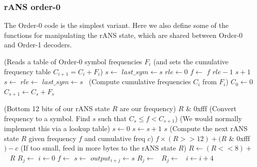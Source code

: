\documentclass[a4paper]{article}
\begin{document}
\subsubsection*{rANS order-0}

The Order-0 code is the simplest variant.
Here we also define some of the functions for manipulating the rANS state, which are shared between Order-0 and Order-1 decoders.

\vskip 0.5cm

\begin{algorithmic}[1]
\Statex (Reads a table of Order-0 symbol frequencies $F_i$
\Statex (and sets the cumulative frequency table $C_{i+1} = C_i+F_i$)
\State $s \gets$ 
\State $last\_sym \gets s$
\State $rle \gets 0$
\Repeat
  \State $f \gets$ 
  \settowidth{\maxwidth}{$C_s$}
  \State {} $f$
    \settowidth{\maxwidth}{rle\ }
    \State {} $rle-1$
    \State {} $s+1$
  \Else
    \State $s \gets$ 
      \State $rle \gets$ 
    \EndIf
  \EndIf
  \State $last\_sym \gets s$
\Statex \quad\ (Compute cumulative frequencies $C_i$ from $F_i$)
\State $C_0 \gets 0$
  \State $C_{s+1} \gets C_s + F_s$
\EndFor
\EndProcedure

\Statex
\Statex (Bottom 12 bits of our rANS state $R$ are our frequency)
  \State \Return $R$ \& 0xfff
\EndFunction
\Statex
\Statex (Convert frequency to a symbol. Find $s$ such that $C_s \le f < C_{s+1}$)
\Statex (We would normally implement this via a lookup table)
  \State $s \gets 0$
    \State $s \gets s+1$
  \EndWhile
  \State \Return $s$
\EndFunction
\Statex
\Statex (Compute the next rANS state $R$ given frequency $f$ and cumulative freq $c$)
  \State \Return $f \times (R >> 12) + (R$ \& 0xfff$) - c$
\EndFunction
\Statex
\Statex (If too small, feed in more bytes to the rANS state $R$)
    \State $R \gets (R << 8) +$\ 
  \EndWhile
  \State \Return $R$
\EndFunction
\Statex
{}
    \State $R_j \gets$ 
  \EndFor
  \State $i \gets 0$
       \Return
      \EndIf
      \State $f \gets$ 
      \State $s \gets$ 
      \State $output_{i+j} \gets s$
      \State $R_j \gets$\ 
      \State $R_j \gets$\ 
    \EndFor
    \State $i \gets i+4$
  \EndWhile
\EndProcedure
\end{algorithmic}
\end{document}
